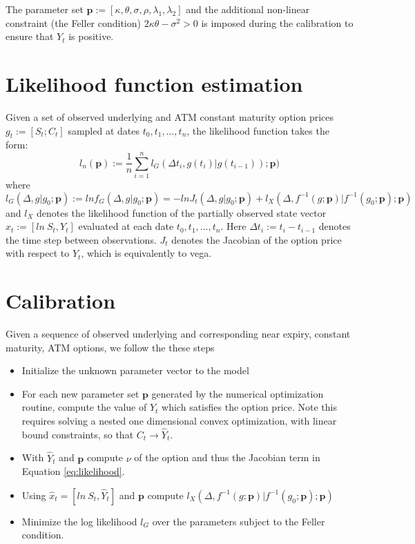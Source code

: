 \documentclass{article}
\newcommand{\be}{\begin{equation}}
\newcommand{\ee}{\end{equation}}
\begin{document}
The parameter set $\mathbf{p}:=[\kappa, \theta, \sigma, \rho, \lambda_1, \lambda_2]$ and the additional non-linear constraint (the Feller condition) $2\kappa\theta - \sigma^2>0$ is imposed during the calibration to ensure that $Y_t$ is positive.



\section{Likelihood function estimation}
Given a set of observed underlying and ATM constant maturity option prices $g_t:=[S_t; C_t]$ sampled at dates $t_0,t_1,\dots, t_n$, the likelihood function takes the form:
\be
l_n(\mathbf{p}):=\frac{1}{n}\sum_{i=1}^nl_G(\Delta t_i,g(t_i)|g(t_{i-1}));\mathbf{p})
\ee
where
\be
l_G(\Delta, g|g_0;\mathbf{p}) := ln f_G(\Delta,g|g_0;\mathbf{p}) = - ln J_t(\Delta, g|g_0;\mathbf{p}) + l_X(\Delta, f^{-1}(g;\mathbf{p})| f^{-1}(g_0;\mathbf{p});\mathbf{p})
\label{eq:likelihood}
\ee
and $l_X$ denotes the likelihood function of the partially observed state vector $x_t:=[ln~S_t, Y_t]$ evaluated at each date $t_0,t_1,\dots, t_n$. Here $\Delta t_i:=t_i-t_{i-1}$ denotes the time step between observations. $J_t$ denotes the Jacobian of the option price with respect to $Y_t$, which is equivalently to vega.

\section{Calibration}

Given a sequence of observed underlying and corresponding near expiry, constant maturity, ATM options, we follow the these steps

\begin{itemize}
\item Initialize the unknown parameter vector to the model
\item For each new parameter set $\mathbf{p}$ generated by the numerical optimization routine, compute the value of $Y_t$ which satisfies the option price. Note this requires solving a nested one dimensional convex optimization, with linear bound constraints, so that $C_t \rightarrow \hat{Y}_t$.
\item With $\hat{Y}_t$ and $\mathbf{p}$ compute $\nu$ of the option and thus the Jacobian term in Equation \ref{eq:likelihood}.
\item Using $\hat{x}_t=[ln~S_t, \hat{Y}_t]$ and $\mathbf{p}$ compute $l_X(\Delta, f^{-1}(g;\mathbf{p})| f^{-1}(g_0;\mathbf{p});\mathbf{p})$
\item Minimize the log likelihood $l_G$ over the parameters subject to the Feller condition. 
\end{itemize}
\end{document}
